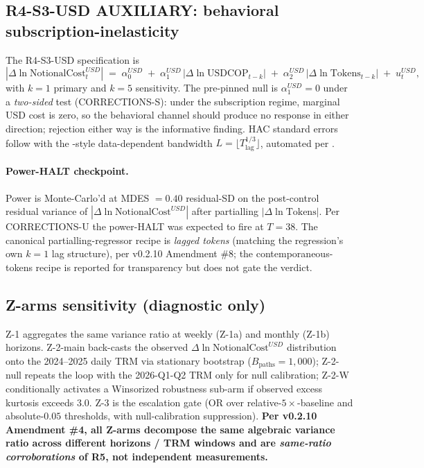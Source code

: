 \documentclass[11pt,letterpaper]{article}
\newcommand{\dln}{\Delta\ln}
\newcommand{\NotionalUsd}{\text{NotionalCost}^{USD}}
\begin{document}
\subsection{R4-S3-USD AUXILIARY: behavioral subscription-inelasticity}

The R4-S3-USD specification is
\begin{equation}
|\dln\NotionalUsd_t| \;=\; \alpha_0^{USD} \;+\; \alpha_1^{USD}\,
|\dln\text{USDCOP}_{t-k}| \;+\; \alpha_2^{USD}\,
|\dln\text{Tokens}_{t-k}| \;+\; u_t^{USD},
\label{eq:r4s3usd}
\end{equation}
with \(k=1\) primary and \(k=5\) sensitivity. The pre-pinned null is
\(\alpha_1^{USD}=0\) under a \emph{two-sided} test (CORRECTIONS-S):
under the subscription regime, marginal USD cost is zero, so the
behavioral channel should produce no response in either direction;
rejection either way is the informative finding. HAC standard errors
follow \citet{NeweyWest1987} with the
\citet[Andrews]{Andrews1991}-style data-dependent bandwidth
\(L = \lfloor T_{\text{lag}}^{1/3} \rfloor\), automated per
\citet{NeweyWest1994}.

\paragraph{Power-HALT checkpoint.}
Power is Monte-Carlo'd at MDES \(=0.40\) residual-SD on the
post-control residual variance of \(|\dln\NotionalUsd|\) after
partialling \(|\dln\text{Tokens}|\). Per CORRECTIONS-U the
power-HALT was expected to fire at \(T = 38\). The canonical
partialling-regressor recipe is \emph{lagged tokens} (matching the
regression's own \(k=1\) lag structure), per v0.2.10 Amendment \#8;
the contemporaneous-tokens recipe is reported for transparency but
does not gate the verdict.

\subsection{Z-arms sensitivity (diagnostic only)}

Z-1 aggregates the same variance ratio at weekly (Z-1a) and monthly
(Z-1b) horizons. Z-2-main back-casts the observed \(\dln\NotionalUsd\)
distribution onto the 2024--2025 daily TRM via stationary bootstrap
(\(B_{\text{paths}} = 1{,}000\)); Z-2-null repeats the loop with the
2026-Q1-Q2 TRM only for null calibration; Z-2-W conditionally
activates a Winsorized robustness sub-arm if observed excess kurtosis
exceeds \(3.0\). Z-3 is the escalation gate
(OR over relative-\(5\!\times\)-baseline and absolute-\(0.05\)
thresholds, with null-calibration suppression). \textbf{Per v0.2.10
Amendment \#4, all Z-arms decompose the same algebraic variance ratio
across different horizons / TRM windows and are
\emph{same-ratio corroborations} of R5, not independent
measurements.}
\end{document}
